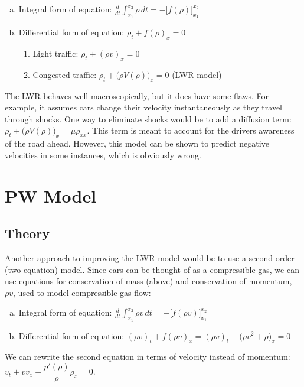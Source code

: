 \documentclass{article}
\begin{document}
\begin{enumerate}[(a)]
\item Integral form of equation: $\displaystyle \frac{d}{dt} \int_{x_1}^{x_2} \rho \, dt = -\Big[ f( \rho ) \Big]_{x_1}^{x_2}$
\item Differential form of equation: $\rho_t + f( \rho )_x = 0$
\begin{enumerate}[i]
\item Light traffic: $\rho_t + (\rho v)_x = 0$
\item Congested traffic: $\rho_t + \Big( \rho V(\rho) \Big)_x = 0$ (LWR model)
\end{enumerate}
\end{enumerate}

The LWR behaves well macroscopically, but it does have some flaws.  For example, it assumes cars change their velocity instantaneously as they travel through shocks.  One way to eliminate shocks would be to add a diffusion term: $\rho_t + \Big( \rho V(\rho) \Big)_x = \mu \rho_{xx}$.  This term is meant to account for the drivers awareness of the road ahead.  However, this model can be shown to predict negative velocities in some instances, which is obviously wrong.

\section{PW Model}

\subsection{Theory}
Another approach to improving the LWR model would be to use a second order (two equation) model. Since cars can be thought of as a compressible gas, we can use equations for conservation of mass (above) and conservation of momentum, $\rho v$, used to model compressible gas flow:

\begin{enumerate}[(a)]
\item Integral form of equation: $\displaystyle \frac{d}{dt} \int_{x_1}^{x_2} \rho v \, dt = -\Big[ f( \rho v ) \Big]_{x_1}^{x_2}$
\item Differential form of equation: $(\rho v)_t + f( \rho v )_x = (\rho v)_t + \Big( \rho v^2 + \rho \Big)_x = 0$
\end{enumerate}

We can rewrite the second equation in terms of velocity instead of momentum: $v_t + v v_x + \dfrac{p'(\rho)}{\rho} \rho_x = 0$. \\
\end{document}
